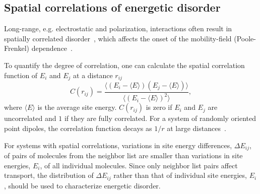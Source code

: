 \subsection{Spatial correlations of energetic disorder}
\label{sec:ecorrelation}

Long-range, e.g. electrostatic and polarization, interactions often result in spatially correlated disorder~\cite{dunlap_charge-dipole_1996}, which affects the onset of the mobility-field (Poole-Frenkel) dependence~\cite{derrida_velocity_1983,novikov_essential_1998,nagata_atomistic_2008}.    

To quantify the degree of correlation, one can calculate the spatial correlation function of $E_i$ and $E_j$ at a distance $r_{ij}$
\begin{equation}
\label{equ:cf}
C(r_{ij}) = \frac{  \langle \left( E_i-\langle E\rangle \right)
                   \left( E_j-\langle E\rangle \right)\rangle}
                   {\langle\left( E_i -\langle E\rangle \right)^2\rangle},
\end{equation}
where $\langle E\rangle$ is the average site energy. $C(r_{ij})$ is zero if $E_i$ and $E_j$ are uncorrelated and $1$ if they are fully correlated. For a system of randomly oriented point dipoles, the correlation function decays as $1/r$ at large distances~\cite{novikov_cluster_1995}.

For systems with spatial correlations, variations in site energy differences, $\Delta E_{ij}$, of pairs of molecules from the neighbor list are smaller than variations in site energies, $E_i$, of all individual molecules. Since only neighbor list pairs affect transport, the distribution of $\Delta E_{ij}$ rather than that of individual site energies, $E_i$, should be used to characterize energetic disorder.